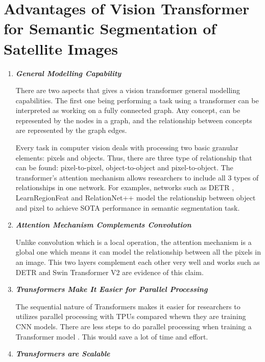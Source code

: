 \section{Advantages of Vision Transformer for Semantic Segmentation of Satellite Images}
\begin{enumerate}
    \item \textit{\textbf{General Modelling Capability}}
    
    There are two aspects that gives a vision transformer general modelling capabilities. The first one being performing a task using a transformer can be interpreted as working on a fully connected graph. Any concept, can be represented by the nodes in a graph, and the relationship between concepts are represented by the graph edges.

    Every task in computer vision deals with processing two basic granular elements: pixels and objects. Thus, there are three type of relationship that can be found: pixel-to-pixel, object-to-object and pixel-to-object. The transformer's attention mechanism allows researchers to include all 3 types of relationships in one network. For examples, networks such as DETR \cite{detr}, LearnRegionFeat \cite{learnregionfeat} and RelationNet++ \cite{regionnet++} model the relationship between object and pixel to achieve SOTA performance in semantic segmentation task.  

    \item \textit{\textbf{Attention Mechanism Complements Convolution}}

    Unlike convolution which is a local operation, the attention mechanism is a global one which means it can model the relationship between all the pixels in an image. This two layers complement each other very well and works such as DETR \cite{detr} and Swin Transformer V2 \cite{swin-v2} are evidence of this claim.

    \item \textit{\textbf{Transformers Make It Easier for Parallel Processing}}

        The sequential nature of Transformers makes it easier for researchers to utilizes parallel processing with TPUs compared whewn they are training CNN models. There are less steps to do parallel processing when training a Transformer model \cite{swin-v1}. This would save a lot of time and effort.


    \item \textit{\textbf{Transformers are Scalable}}


\end{enumerate}
